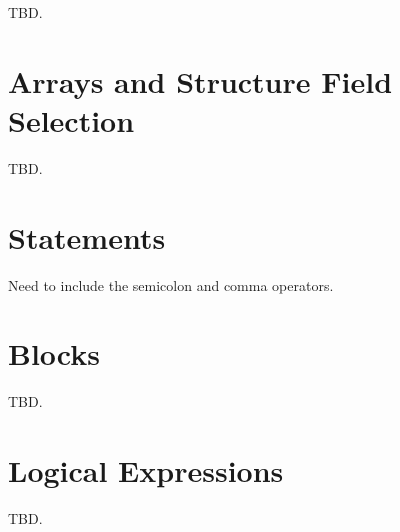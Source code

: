 TBD.


\section{Arrays and Structure Field Selection}
\label{ccik2:sasf0}

TBD.


\section{Statements}
\label{ccik2:ssta0}

Need to include the semicolon and comma operators.



\section{Blocks}
\label{ccik2:sblk0}

TBD.


\section{Logical Expressions}
\label{ccik2:slex0}

TBD.


